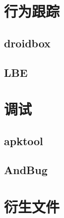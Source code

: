 \section{行为跟踪}
\subsection{droidbox}
\subsection{LBE}

\section{调试}
\label{Sec:debug}
\subsection{apktool}
\subsection{AndBug}

\section{衍生文件}
